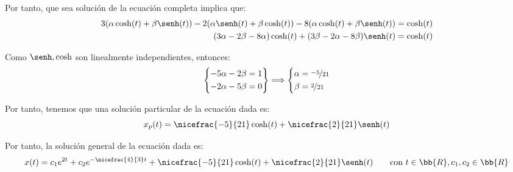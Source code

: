 \begin{ejercicio}
    Por tanto, que sea solución de la ecuación completa implica que:
    \begin{align*}
        3(\alpha\cosh(t)+\beta\senh(t))-2(\alpha\senh(t)+\beta\cosh(t))-8(\alpha\cosh(t)+\beta\senh(t))&=\cosh(t)\\
        (3\alpha-2\beta-8\alpha)\cosh(t)+(3\beta-2\alpha-8\beta)\senh(t)&=\cosh(t)
    \end{align*}

    Como $\senh,\cosh$ son linealmente independientes, entonces:
    \begin{equation*}
        \left\{
        \begin{aligned}
            -5\alpha-2\beta &= 1\\
            -2\alpha-5\beta &= 0
        \end{aligned}
        \right\}
        \Longrightarrow
        \left\{
        \begin{aligned}
            \alpha &= \nicefrac{-5}{21}\\
            \beta &= \nicefrac{2}{21}
        \end{aligned}
        \right.
    \end{equation*}

    Por tanto, tenemos que una solución particular de la ecuación dada es:
    \begin{equation*}
        x_p(t)=\nicefrac{-5}{21}\cosh(t)+\nicefrac{2}{21}\senh(t)
    \end{equation*}

    Por tanto, la solución general de la ecuación dada es:
    \begin{equation*}
        x(t)=c_1e^{2t}+c_2e^{-\nicefrac{4}{3}t}+\nicefrac{-5}{21}\cosh(t)+\nicefrac{2}{21}\senh(t)
        \qquad \text{con } t\in \bb{R},c_1,c_2\in \bb{R}
    \end{equation*}
\end{ejercicio}

